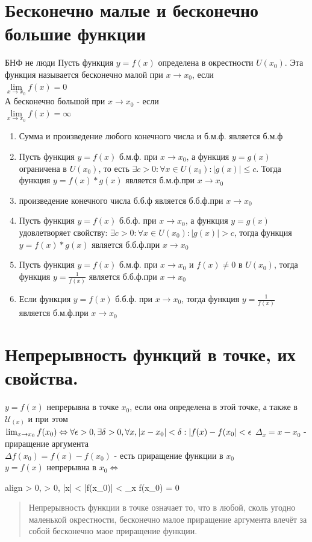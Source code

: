 \documentclass[oneside]{book}
\newcommand{\boxedeq}[2]{\begin{empheq}[box={\fboxsep=6pt\fbox}]{align}\label{#1}#2\end{empheq}}
\begin{document}
\begin{enumerate}
\chapter{Бесконечно малые и бесконечно большие функции}
БНФ не люди
Пусть функция $y = f(x)$ определена в окрестности $U(x_0)$. Эта функция называется бесконечно малой при $x \rightarrow x_0$, если\\ $\lim\limits_{x\rightarrow x_0}f(x)=0$\\
А бесконечно большой при $x \rightarrow x_0$ - если\\ $\lim\limits_{x\rightarrow x_0}f(x)=\infty$
\begin{enumerate}
	\item Сумма и произведение любого конечного числа и б.м.ф. является б.м.ф
	\item Пусть функция $y = f(x)$ б.м.ф. при $x \rightarrow x_0$, а функция $y = g(x)$ ограничена в $U(x_0)$, то есть  $\exists c > 0 : \forall x \in U(x_0): |g(x)|\leq c$. Тогда функция $y=f(x)*g(x)$ является б.м.ф.при $x \rightarrow x_0$
	\item произведение конечного числа б.б.ф является б.б.ф.при $x \rightarrow x_0$
	\item Пусть функция $y = f(x)$ б.б.ф. при $x \rightarrow x_0$, а функция $y = g(x)$ удовлетворяет свойству: $\exists c > 0 : \forall x \in U(x_0): |g(x)| > c$, тогда функция $y=f(x)*g(x)$ является б.б.ф.при $x \rightarrow x_0$
	\item Пусть функция $y = f(x)$ б.м.ф. при $x \rightarrow x_0$ и $f(x) \neq 0$ в $U(x_0)$, тогда функция $y=\frac{1}{f(x)}$ является б.б.ф.при $x \rightarrow x_0$
	\item Если функция $y = f(x)$ б.б.ф. при $x \rightarrow x_0$, тогда функция $y=\frac{1}{f(x)}$ является б.м.ф.при $x \rightarrow x_0$
\end{enumerate}


\chapter[Непрерывность]{Непрерывность функций в точке, их свойства.}
$y = f(x)$ непрерывна в точке $x_0$, если она определена в этой точке, а также в $\mathcal{U}_{(x)}$ и при этом
$\lim_{x \rightarrow x_0}{f(x_0) \Leftrightarrow \\ \forall \epsilon > 0, \exists \delta > 0, \forall x, |x - x_0|
< \delta : |f(x) - f(x_0| < \epsilon }$
$\Delta_x = x-x_0$ - приращение аргумента \\
$\Delta f(x_0) = f(x) - f(x_0)$ - есть приращение функции в $x_0$ \\
$y = f(x)$ непрерывна в $x_0 \Leftrightarrow$
\boxedeq{eq:*}{
    \forall \epsilon > 0, \exists \delta > 0, |\Delta x| < \delta \Rightarrow |\Delta f(x_0)|
    < \epsilon \Leftrightarrow \lim_{\Delta x \rightarrow 0}{\Delta f(x_0)} = 0
}
\begin{quote}
    Непрерывность функции в точке означает то, что в любой, сколь угодно маленькой окрестности, бесконечно малое приращение аргумента
    влечёт за собой бесконечно маое приращение функции.
\end{quote}


\end{enumerate}
\end{document}
